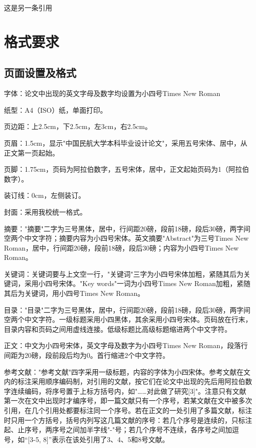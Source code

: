 \documentclass[
	StudentName     = 姓名,
	StudentID       = 学号,
	AdvisorName     = 指导教师,
	Grade           = 年级,
	Major           = 专业,
	Department      = 一个很长很长的名字,
	SubmitYear		= 2022,
	SubmitMonth		= 5,
	Title           = 论文中文题目,
	TitleEng        = {{English Title}}
]{cauc_thesis}
\begin{document}
	这是另一条引用\cite{censorMultiprojectionAlgorithmUsing1994a}
	\section{格式要求}
	\subsection{页面设置及格式}
	
	字体：论文中出现的英文字母及数字均设置为小四号{\rm Times New Roman}
	
	纸型：A4（ISO）纸，单面打印。
	
	页边距：上2.5cm，下2.5cm，左3cm，右2.5cm。
	
	页眉：1.5cm，显示"中国民航大学本科毕业设计论文"，采用五号宋体、居中，从正文第一页起始。
	
	页脚：1.75cm，页码为阿拉伯数字，五号宋体，居中，正文起始页码为1（阿拉伯数字）。
	
	装订线：0cm，左侧装订。
	
	封面：采用我校统一格式。
	
	摘要："摘要"二字为三号黑体，居中，行间距20磅，段前18磅，段后30磅，两字间空两个中文字符；摘要内容为小四号宋体。英文摘要"Abstract"为三号Times New Roman，居中，行间距20磅，段前18磅，段后30磅；内容为小四号Times New Roman。
	
	关键词：关键词要与上文空一行，"关键词"三字为小四号宋体加粗，紧随其后为关键词，采用小四号宋体。"Key
	words"一词为小四号Times New Roman加粗，紧随其后为关键词，用小四号Times New Roman。
	
	目录："目录"二字为三号黑体，居中，行间距20磅，段前18磅，段后30磅，两字间空两个中文字符。一级标题采用小四黑体，其余采用小四号宋体。页码放在行末，目录内容和页码之间用虚线连接。低级标题比高级标题缩进两个中文字符。
	
	正文：中文为小四号宋体，英文字母及数字为小四号Times New Roman，段落行间距为20磅，段前段后均为0。首行缩进2个中文字符。
	
	参考文献："参考文献"四字采用一级标题，内容的字体为小四宋体。参考文献在文内的标注采用顺序编码制，对引用的文献，按它们在论文中出现的先后用阿拉伯数字连续编码，将序号置于上标方括号内，如"……对此做了研究[3]"。注意只有文献第一次在文中出现时才编序号，即一篇文献只有一个序号，若某文献在文中被多次引用，在几个引用处都要标注同一个序号。若在正文的一处引用了多篇文献，标注时只用一个方括号，括号内列写这几篇文献的序号：若几个序号是连续的，只标注起、止序号，两序号之间加半字线"-"号；若几个序号不连续，各序号之间加逗号，如“[3-5, 8]”表示在该处引用了3、4、5和8号文献。
	
\end{document}
